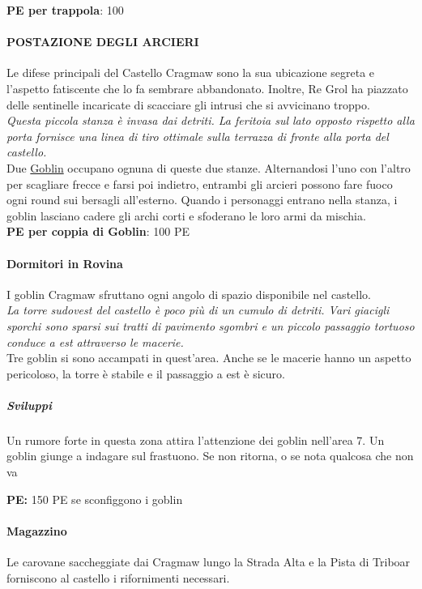 \documentclass{article}
\begin{document}
\textbf{PE per trappola}: 100

\paragraph{POSTAZIONE DEGLI ARCIERI} Le difese principali del Castello Cragmaw sono la sua
ubicazione segreta e l'aspetto fatiscente che lo fa sembrare
abbandonato. Inoltre, Re Grol ha piazzato delle sentinelle
incaricate di scacciare gli intrusi che si avvicinano troppo.\\

\textit{Questa piccola stanza è invasa dai detriti. La feritoia sul lato
opposto rispetto alla porta fornisce una linea di tiro ottimale
sulla terrazza di fronte alla porta del castello.}\\

Due \hyperlink{goblin}{Goblin} occupano ognuna di queste due stanze.
Alternandosi l'uno con l'altro per scagliare frecce e farsi poi
indietro, entrambi gli arcieri possono fare fuoco ogni round sui bersagli all’esterno. Quando i personaggi entrano nella
stanza, i goblin lasciano cadere gli archi corti e sfoderano le
loro armi da mischia.\\


\textbf{PE per coppia di Goblin}: 100 PE

\paragraph{ Dormitori in Rovina} I goblin Cragmaw sfruttano ogni angolo di spazio disponibile
nel castello. \\ 
\textit{La torre sudovest del castello è poco più di un cumulo di detriti.
Vari giacigli sporchi sono sparsi sui tratti di pavimento sgombri
e un piccolo passaggio tortuoso conduce a est attraverso le
macerie.} \\

Tre goblin si sono accampati in quest'area. Anche se le
macerie hanno un aspetto pericoloso, la torre è stabile e il
passaggio a est è sicuro. 

\subparagraph{Sviluppi}
Un rumore forte in questa zona attira l’attenzione dei goblin
nell’area 7. Un goblin giunge a indagare sul frastuono. Se non
ritorna, o se nota qualcosa che non va

\textbf{PE: } 150 PE se sconfiggono i goblin

\paragraph{ Magazzino } 
Le carovane saccheggiate dai Cragmaw lungo la
Strada Alta e la Pista di Triboar forniscono al castello i
rifornimenti necessari.
\end{document}
